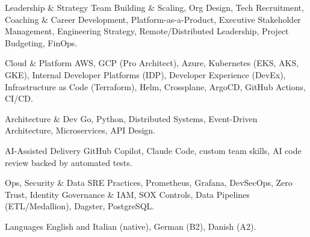 
\vspace{2.9mm}
\begin{cvskills}

  \cvskill
  {Leadership \& Strategy}
  {Team Building \& Scaling, Org Design, Tech Recruitment, Coaching \& Career Development, Platform-as-a-Product, Executive Stakeholder Management, Engineering Strategy, Remote/Distributed Leadership, Project Budgeting, FinOps.}

  \cvskill
  {Cloud \& Platform}
  {AWS, GCP (Pro Architect), Azure, Kubernetes (EKS, AKS, GKE), Internal Developer Platforms (IDP), Developer Experience (DevEx), Infrastructure as Code (Terraform), Helm, Crossplane, ArgoCD, GitHub Actions, CI/CD.}

  \cvskill
  {Architecture \& Dev}
  {Go, Python, Distributed Systems, Event-Driven Architecture, Microservices, API Design.}

  \cvskill
  {AI-Assisted Delivery}
  {GitHub Copilot, Claude Code, custom team skills, AI code review backed by automated tests.}

  \cvskill
  {Ops, Security \& Data}
  {SRE Practices, Prometheus, Grafana, DevSecOps, Zero Trust, Identity Governance \& IAM, SOX Controls, Data Pipelines (ETL/Medallion), Dagster, PostgreSQL.}

  \cvskill
  {Languages}
  {English and Italian (native), German (B2), Danish (A2).}

\end{cvskills}
